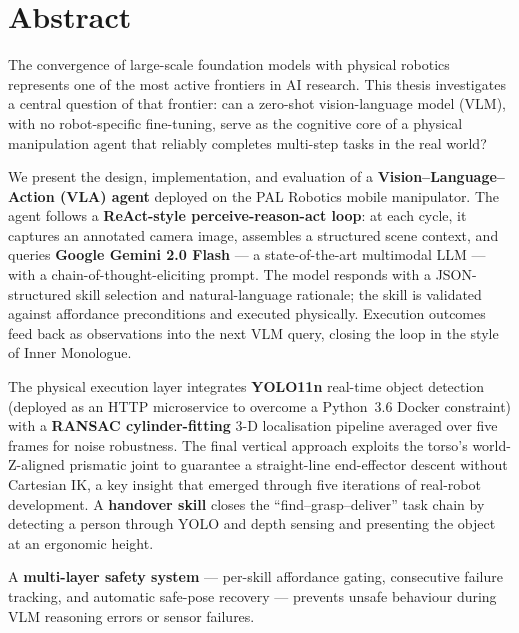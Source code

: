 \chapter*{Abstract}

The convergence of large-scale foundation models with physical robotics represents one
of the most active frontiers in AI research.
This thesis investigates a central question of that frontier: can a zero-shot
vision-language model (VLM), with no robot-specific fine-tuning, serve as the cognitive
core of a physical manipulation agent that reliably completes multi-step tasks in the
real world?

We present the design, implementation, and evaluation of a \textbf{Vision--Language--Action
(VLA) agent} deployed on the PAL Robotics \tiago{} mobile manipulator.
The agent follows a \textbf{ReAct-style perceive-reason-act loop}: at each cycle, it
captures an annotated camera image, assembles a structured scene context, and queries
\textbf{Google Gemini 2.0 Flash} --- a state-of-the-art multimodal LLM --- with a
chain-of-thought-eliciting prompt.
The model responds with a JSON-structured skill selection and natural-language rationale;
the skill is validated against affordance preconditions and executed physically.
Execution outcomes feed back as observations into the next VLM query, closing the loop
in the style of Inner Monologue.

The physical execution layer integrates \textbf{YOLO11n} real-time object detection
(deployed as an HTTP microservice to overcome a Python~3.6 Docker constraint) with a
\textbf{RANSAC cylinder-fitting} 3-D localisation pipeline averaged over five frames
for noise robustness.
The final vertical approach exploits the \tiago{} torso's world-Z-aligned prismatic
joint to guarantee a straight-line end-effector descent without Cartesian IK, a key
insight that emerged through five iterations of real-robot development.
A \textbf{handover skill} closes the ``find--grasp--deliver'' task chain by detecting
a person through YOLO and depth sensing and presenting the object at an ergonomic height.

A \textbf{multi-layer safety system} --- per-skill affordance gating, consecutive
failure tracking, and automatic safe-pose recovery --- prevents unsafe behaviour during
VLM reasoning errors or sensor failures.

